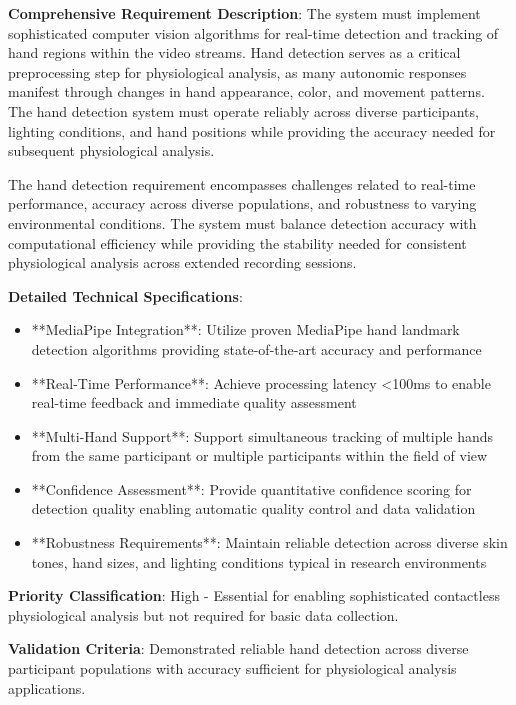 \documentclass[12pt,a4paper]{report}
\begin{document}
\textbf{Comprehensive Requirement Description}: The system must implement sophisticated computer vision algorithms for
real-time detection and tracking of hand regions within the video streams. Hand detection serves as a critical
preprocessing step for physiological analysis, as many autonomic responses manifest through changes in hand appearance,
color, and movement patterns. The hand detection system must operate reliably across diverse participants, lighting
conditions, and hand positions while providing the accuracy needed for subsequent physiological analysis.

The hand detection requirement encompasses challenges related to real-time performance, accuracy across diverse
populations, and robustness to varying environmental conditions. The system must balance detection accuracy with
computational efficiency while providing the stability needed for consistent physiological analysis across extended
recording sessions.

\textbf{Detailed Technical Specifications}:

\begin{itemize}
\item **MediaPipe Integration**: Utilize proven MediaPipe hand landmark detection algorithms providing state-of-the-art
  accuracy and performance
\item **Real-Time Performance**: Achieve processing latency <100ms to enable real-time feedback and immediate quality
  assessment
\item **Multi-Hand Support**: Support simultaneous tracking of multiple hands from the same participant or multiple
  participants within the field of view
\item **Confidence Assessment**: Provide quantitative confidence scoring for detection quality enabling automatic quality
  control and data validation
\item **Robustness Requirements**: Maintain reliable detection across diverse skin tones, hand sizes, and lighting
  conditions typical in research environments

\end{itemize}
\textbf{Priority Classification}: High - Essential for enabling sophisticated contactless physiological analysis but not
required for basic data collection.

\textbf{Validation Criteria}: Demonstrated reliable hand detection across diverse participant populations with accuracy
sufficient for physiological analysis applications.
\end{document}
